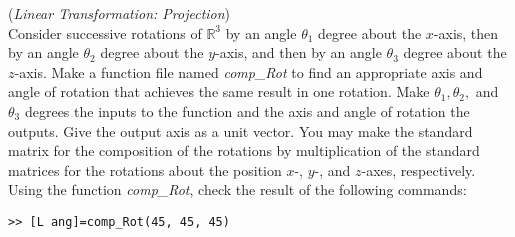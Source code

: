 \begin{exer} (\textit{Linear Transformation: Projection})\\ 
Consider successive rotations of $\mathbb{R}^{3}$ by an angle $\theta_{1}$ degree about the $x$-axis, then by an angle $\theta_{2}$ degree about the $y$-axis, and then by an angle $\theta_{3}$ degree about the $z$-axis. Make a function file named \textit{comp\_Rot} to find an appropriate axis and angle of rotation that achieves the same result in one rotation. Make $\theta_{1}, \theta_{2},$ and $\theta_{3}$ degrees the inputs to the function and the axis and angle of rotation the outputs. Give the output axis as a unit vector. You may make the standard matrix for the composition of the rotations by multiplication of the standard matrices for the rotations about the position $x$-, $y$-, and $z$-axes, respectively. Using the function \textit{comp\_Rot}, check the result of the following commands:

\vspace{2mm}

\begin{verbatim}
>> [L ang]=comp_Rot(45, 45, 45)
\end{verbatim}

\end{exer}



